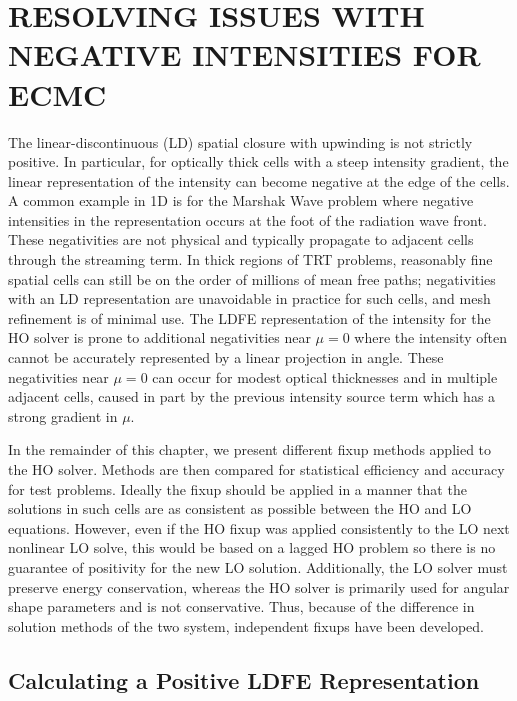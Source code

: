 

\chapter{\uppercase{Resolving Issues with Negative Intensities for ECMC}}
\label{chp:negativities}

The linear-discontinuous (LD) spatial closure with upwinding is not strictly positive.  In
particular, for optically thick cells with a steep intensity gradient, the linear
representation of the intensity can become negative at the edge of the cells.  A common
example in 1D is for the Marshak Wave problem where negative intensities in the
representation occurs at the foot of the radiation wave front. These negativities are not
physical and typically propagate to adjacent cells through the streaming term. In thick regions of TRT problems,
reasonably fine spatial cells can still be on the order of millions of mean free paths;
negativities with an LD representation are unavoidable in practice for such cells, and
mesh refinement is of minimal use.  The LDFE representation of the intensity for the HO solver is prone to additional negativities near
$\mu=0$ where the intensity often cannot be accurately represented by a linear projection in
angle.  These negativities near $\mu=0$ can occur for modest optical thicknesses and in
multiple adjacent cells, caused in part by the previous intensity source term which has a
strong gradient in $\mu$. 

In the remainder of this chapter, we present different fixup methods applied to the HO solver.
Methods are then compared for statistical efficiency and accuracy for test problems.
Ideally the fixup should be applied in a manner that the solutions in such cells are as consistent as possible between the HO
and LO equations.  However, even if the HO fixup was applied consistently to the LO
next nonlinear LO solve, this would be based on a lagged HO problem so there is no
guarantee of positivity for the new LO solution. Additionally, the LO solver must preserve
energy conservation, whereas the HO solver is primarily used for angular shape parameters
and is not conservative. Thus, because of the difference in solution
methods of the two system, independent fixups have been developed.  

\section{Calculating a Positive LDFE Representation}
\label{sec:pos_ldfe}

